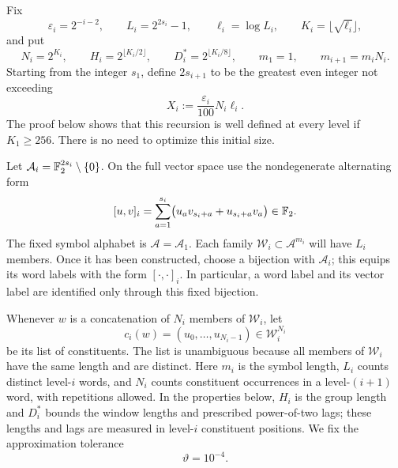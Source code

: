 Fix
\begin{equation}\label{eq:word-parameters}
  \varepsilon_i=2^{-i-2},\qquad
  L_i=2^{2s_i}-1,\qquad \ell_i=\log L_i,\qquad
  K_i=\lfloor\sqrt{\ell_i}\rfloor,
\end{equation}
and put
\begin{equation}\label{eq:word-lengths}
  N_i=2^{K_i},\qquad H_i=2^{\lfloor K_i/2\rfloor},\qquad
  D_i^*=2^{\lfloor K_i/8\rfloor},\qquad
  m_1=1,\qquad m_{i+1}=m_iN_i.
\end{equation}
Starting from the integer $s_1$, define $2s_{i+1}$ to be the greatest even
integer not exceeding
\begin{equation}\label{eq:word-recursion}
  X_i:=\frac{\varepsilon_i}{100}N_i\ell_i.
\end{equation}
The proof below shows that this recursion is well defined at every level
if $K_1\ge256$.  There is no need to optimize this initial size.

Let $\mathcal A_i=\mathbb F_2^{2s_i}\setminus\{0\}$.  On the full vector space
use the nondegenerate alternating form
\[
  [u,v]_i=\sum_{a=1}^{s_i}
     \bigl(u_a v_{s_i+a}+u_{s_i+a}v_a\bigr)\in\mathbb F_2.
\]
The fixed symbol alphabet is $\mathcal A=\mathcal A_1$.
Each family $\mathcal W_i\subset\mathcal A^{m_i}$ will have $L_i$ members.
Once it has been constructed, choose a bijection with $\mathcal A_i$;
this equips its word labels with the form $[\cdot,\cdot]_i$.
In particular, a word label and its vector label are identified only
through this fixed bijection.

Whenever $w$ is a concatenation of $N_i$ members of $\mathcal W_i$, let
\[
  c_i(w)=(u_0,\ldots,u_{N_i-1})\in\mathcal W_i^{N_i}
\]
be its list of constituents.  The list is unambiguous because all members
of $\mathcal W_i$ have the same length and are distinct.
Here $m_i$ is the symbol length, $L_i$ counts distinct level-$i$
words, and $N_i$ counts constituent occurrences in a level-$(i+1)$
word, with repetitions allowed. In the properties below, $H_i$ is
the group length and $D_i^*$ bounds the window lengths and prescribed
power-of-two lags; these lengths and lags are measured in level-$i$
constituent positions.
We fix the approximation tolerance
\begin{equation}\label{eq:word-tv-tolerance}
  \vartheta=10^{-4}.
\end{equation}

